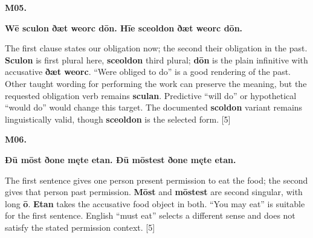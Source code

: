 \par\begin{minipage}{\linewidth}\raggedright
\textbf{M05.}

\textbf{Wē sculon ðæt weorc dōn. Hīe sceoldon ðæt weorc dōn.}

The first clause states our obligation now; the second their obligation in the past. \textbf{Sculon} is first plural here, \textbf{sceoldon} third plural; \textbf{dōn} is the plain infinitive with accusative \textbf{ðæt weorc}. “Were obliged to do” is a good rendering of the past. Other taught wording for performing the work can preserve the meaning, but the requested obligation verb remains \textbf{sculan}. Predictive “will do” or hypothetical “would do” would change this target. The documented \textbf{scoldon} variant remains linguistically valid, though \textbf{sceoldon} is the selected form. [5]

\end{minipage}\par\addvspace{4pt}

\par\begin{minipage}{\linewidth}\raggedright
\textbf{M06.}

\textbf{Ðū mōst ðone męte etan. Ðū mōstest ðone męte etan.}

The first sentence gives one person present permission to eat the food; the second gives that person past permission. \textbf{Mōst} and \textbf{mōstest} are second singular, with long \textbf{ō}. \textbf{Etan} takes the accusative food object in both. “You may eat” is suitable for the first sentence. English “must eat” selects a different sense and does not satisfy the stated permission context. [5]

\end{minipage}\par\addvspace{4pt}


